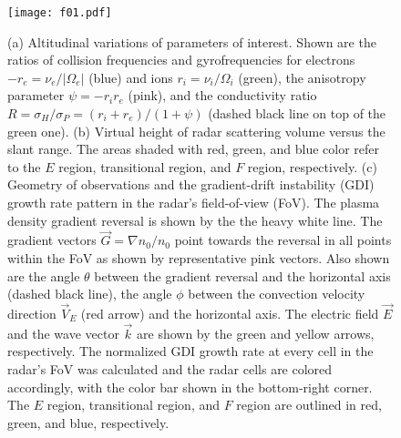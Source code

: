 \begin{figure}
	\centering
	\texttt{[image: f01.pdf]}
	\caption[Overview of altitudinal variations and model set-up of MCM]{(a) Altitudinal variations of parameters of interest. Shown are the ratios of collision frequencies and gyrofrequencies for electrons \(-r_e=\nu_e/|\Omega_e|\) (blue) and ions \(r_i=\nu_i/\Omega_i\) (green), the anisotropy parameter \(\psi=-r_i r_e\) (pink), and the conductivity ratio \(R=\sigma_H/\sigma_P = \left(r_i+r_e\right)/\left(1+\psi\right)\) (dashed black line on top of the green one).  (b) Virtual height of radar scattering volume versus the slant range. The areas shaded with red, green, and blue color refer to the \(E\) region, transitional region, and \(F\) region, respectively. (c) Geometry of observations and the gradient-drift instability (GDI) growth rate pattern in the radar's field-of-view (FoV). The plasma density gradient reversal is shown by the the heavy white line. The gradient vectors \(\vec{G}=\nabla n_0/n_0\) point towards the reversal in all points within the FoV as shown by representative pink vectors. Also shown are the angle \(\theta\) between the gradient reversal and the horizontal axis (dashed black line),  the angle \(\phi\) between the convection velocity direction \(\vec{V}_E\) (red arrow) and the horizontal axis. The electric field \(\vec{E}\)  and the wave vector  \(\vec{k}\) are shown by the green and yellow arrows, respectively. The normalized GDI growth rate at every cell in the radar's FoV was calculated and the radar cells are colored accordingly, with the color bar shown in the bottom-right corner.  The \(E\) region, transitional region, and \(F\) region are outlined in red, green, and blue, respectively.}
	\label{fig:1}
\end{figure}



